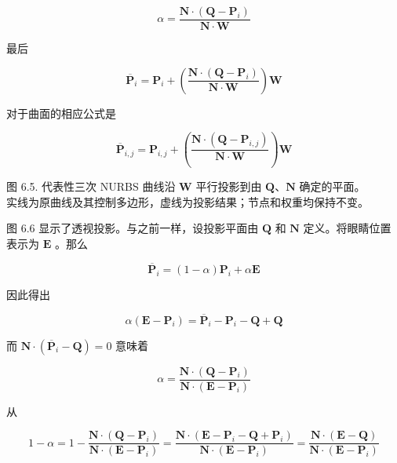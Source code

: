 \documentclass[../main.tex]{subfiles}
\begin{document}
\[
\alpha  = \frac{\mathbf{N} \cdot  \left( {\mathbf{Q} - {\mathbf{P}}_{i}}\right) }{\mathbf{N} \cdot  \mathbf{W}}
\]

最后

\[
{\overline{\mathbf{P}}}_{i} = {\mathbf{P}}_{i} + \left( \frac{\mathbf{N} \cdot  \left( {\mathbf{Q} - {\mathbf{P}}_{i}}\right) }{\mathbf{N} \cdot  \mathbf{W}}\right) \mathbf{W} \tag{6.14}
\]

对于曲面的相应公式是

\[
{\overline{\mathbf{P}}}_{i,j} = {\mathbf{P}}_{i,j} + \left( \frac{\mathbf{N} \cdot  \left( {\mathbf{Q} - {\mathbf{P}}_{i,j}}\right) }{\mathbf{N} \cdot  \mathbf{W}}\right) \mathbf{W} \tag{6.15}
\]

\begin{center}
\begin{minipage}{19cm}
\vspace*{.6\baselineskip}
\centering
{}
\par\smallskip
图 6.5. 代表性三次 NURBS 曲线沿 $\mathbf W$ 平行投影到由 $\mathbf Q$、$\mathbf N$ 确定的平面。\\
实线为原曲线及其控制多边形，虚线为投影结果；节点和权重均保持不变。
\end{minipage}
\end{center}

图 6.6 显示了透视投影。与之前一样，设投影平面由 \(\mathbf{Q}\) 和 \(\mathbf{N}\) 定义。将眼睛位置表示为 \(\mathbf{E}\) 。那么

\[
{\overline{\mathbf{P}}}_{i} = \left( {1 - \alpha }\right) {\mathbf{P}}_{i} + \alpha \mathbf{E} \tag{6.16}
\]



因此得出

\[
\alpha \left( {\mathbf{E} - {\mathbf{P}}_{i}}\right)  = {\overline{\mathbf{P}}}_{i} - {\mathbf{P}}_{i} - \mathbf{Q} + \mathbf{Q}
\]

而 \(\mathbf{N} \cdot  \left( {{\overline{\mathbf{P}}}_{i} - \mathbf{Q}}\right)  = 0\) 意味着

\[
\alpha  = \frac{\mathbf{N} \cdot  \left( {\mathbf{Q} - {\mathbf{P}}_{i}}\right) }{\mathbf{N} \cdot  \left( {\mathbf{E} - {\mathbf{P}}_{i}}\right) }
\]

从

\[
1 - \alpha  = 1 - \frac{\mathbf{N} \cdot  \left( {\mathbf{Q} - {\mathbf{P}}_{i}}\right) }{\mathbf{N} \cdot  \left( {\mathbf{E} - {\mathbf{P}}_{i}}\right) } = \frac{\mathbf{N} \cdot  \left( {\mathbf{E} - {\mathbf{P}}_{i} - \mathbf{Q} + {\mathbf{P}}_{i}}\right) }{\mathbf{N} \cdot  \left( {\mathbf{E} - {\mathbf{P}}_{i}}\right) } = \frac{\mathbf{N} \cdot  \left( {\mathbf{E} - \mathbf{Q}}\right) }{\mathbf{N} \cdot  \left( {\mathbf{E} - {\mathbf{P}}_{i}}\right) }
\]
\end{document}
